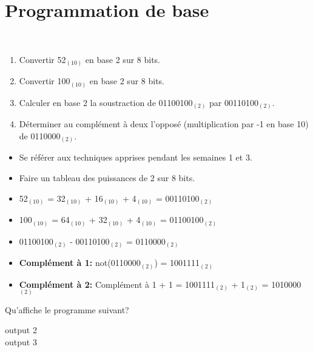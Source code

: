 \section{Programmation de base}

\begin{Exercice}[10 minutes]\\
    \begin{enumerate}
        \item Convertir 52$_{(10)}$ en base 2 sur 8 bits.
        \item Convertir 100$_{(10)}$ en base 2 sur 8 bits.
        \item Calculer en base 2 la soustraction de 01100100$_{(2)}$ par 00110100$_{(2)}$.
        \item Déterminer au complément à deux l'opposé (multiplication par -1 en base 10) de 0110000$_{(2)}$.
    \end{enumerate}
\begin{conseil}
   \begin{itemize}
        \item Se référer aux techniques apprises pendant les semaines 1 et 3.
       \item Faire un tableau des puissances de 2 sur 8 bits.
   \end{itemize}
\end{conseil}
    
\begin{solution}
\begin{itemize}
    \item 52$_{(10)}$ = 32$_{(10)}$ + 16$_{(10)}$ + 4$_{(10)}$ = 00110100$_{(2)}$
    \item 100$_{(10)}$ = 64$_{(10)}$ + 32$_{(10)}$ + 4$_{(10)}$ = 01100100$_{(2)}$
    \item 01100100$_{(2)}$ - 00110100$_{(2)}$ = 0110000$_{(2)}$
    \item \textbf{Complément à 1:} not(0110000$_{(2)}$) = 1001111$_{(2)}$ 
    \item \textbf{Complément à 2:} Complément à 1 + 1 = 1001111$_{(2)}$ + 1$_{(2)}$ = 1010000$_{(2)}$
\end{itemize}   
\end{solution}

\end{Exercice}

\begin{Exercice}[5 minutes]
    Qu'affiche le programme suivant?
    

    \begin{solution}
        output 2 \\
        output 3
    \end{solution}
\end{Exercice}

